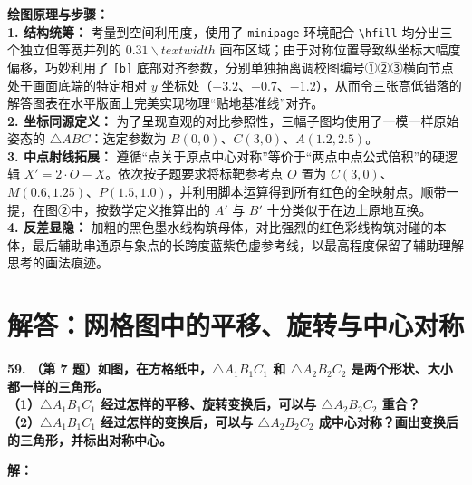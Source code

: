 \vspace{0.4cm}
{\small\color{blue!70!black}
\textbf{绘图原理与步骤：}\\
\textbf{1. 结构统筹：} 考量到空间利用度，使用了 \texttt{minipage} 环境配合 \texttt{\textbackslash{}hfill} 均分出三个独立但等宽并列的 $0.31\backslash{}textwidth$ 画布区域；由于对称位置导致纵坐标大幅度偏移，巧妙利用了 \texttt{[b]} 底部对齐参数，分别单独抽离调校图编号①②③横向节点处于画面底端的特定相对 $y$ 坐标处（$-3.2$、$-0.7$、$-1.2$），从而令三张高低错落的解答图表在水平版面上完美实现物理“贴地基准线”对齐。\\
\textbf{2. 坐标同源定义：} 为了呈现直观的对比参照性，三幅子图均使用了一模一样原始姿态的 $\triangle ABC$：选定参数为 $B(0,0)$、$C(3,0)$、$A(1.2, 2.5)$。\\
\textbf{3. 中点射线拓展：} 遵循“点关于原点中心对称”等价于“两点中点公式倍积”的硬逻辑 $X'=2 \cdot O-X$。依次按子题要求将标靶参考点 $O$ 置为 $C(3,0)$、$M(0.6, 1.25)$、$P(1.5, 1.0)$，并利用脚本运算得到所有红色的全映射点。顺带一提，在图②中，按数学定义推算出的 $A'$ 与 $B'$ 十分类似于在边上原地互换。\\
\textbf{4. 反差显隐：} 加粗的黑色墨水线构筑母体，对比强烈的红色彩线构筑对碰的本体，最后辅助串通原与象点的长跨度蓝紫色虚参考线，以最高程度保留了辅助理解思考的画法痕迹。
}

\newpage



\newpage

\section{解答：网格图中的平移、旋转与中心对称}

\vspace{0.6cm}

\textbf{\LARGE 59.} \textbf{（第 7 题）如图，在方格纸中，$\triangle A_1B_1C_1$ 和 $\triangle A_2B_2C_2$ 是两个形状、大小都一样的三角形。\\
（1）$\triangle A_1B_1C_1$ 经过怎样的平移、旋转变换后，可以与 $\triangle A_2B_2C_2$ 重合？\\
（2）$\triangle A_1B_1C_1$ 经过怎样的变换后，可以与 $\triangle A_2B_2C_2$ 成中心对称？画出变换后的三角形，并标出对称中心。}

\vspace{0.4cm}
\textbf{解：}

